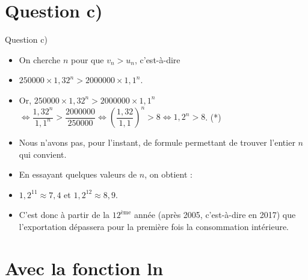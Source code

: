 \documentclass[french,onlymath]{beamer}
\begin{document}

\section{Question c)}

\begin{frame}{Question c)}

\begin{itemize}
 	
	\item On cherche $n$ pour que $v_n > u_n$, c'est-à-dire
		
	\item $250 000 \times 1,32^n > 2 000 000 \times 1,1^n$.
		
	\item Or, $250 000 \times 1,32^n > 2 000 000 \times 1,1^n$\\ $\Leftrightarrow \dfrac{1,32^n}{1,1^n} > \dfrac{2 000 000}{250 000} \Leftrightarrow \left( \dfrac{1,32}{1,1}\right)^n > 8 \Leftrightarrow 1,2^n > 8$. (*)
	
	\item Nous n'avons pas, pour l'instant, de formule permettant de trouver l'entier $n$ qui convient.
	
	\item En essayant quelques valeurs de $n$, on obtient :
	
	\item $1,2^{11} \approx 7,4$ et $1,2^{12} \approx 8,9$.
	
	\item C'est donc à partir de la $12^{\text{ème}}$ année (après 2005, c'est-à-dire en 2017) que l'exportation dépassera pour la première fois la consommation intérieure.
	
	\end{itemize}
\end{frame}



\section{Avec la fonction ln}
\end{document}
